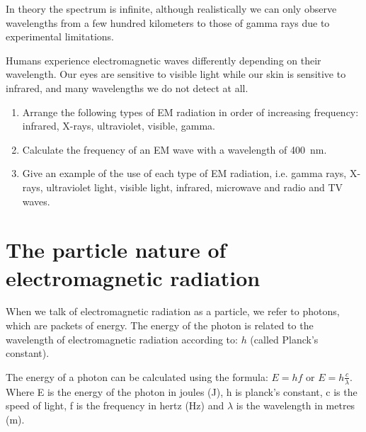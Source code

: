 In theory the spectrum is infinite, although realistically we can only observe wavelengths from a few hundred kilometers to those of gamma rays due to experimental limitations. 

Humans experience electromagnetic waves differently depending on their wavelength. Our eyes are sensitive to visible light while our skin is sensitive to infrared, and many wavelengths we do not detect at all.

{
\begin{enumerate}
\item Arrange the following types of EM radiation in order of increasing frequency: infrared, X-rays, ultraviolet, visible, gamma. 
\item Calculate the frequency of an EM wave with a wavelength of 400~nm.
\item Give an example of the use of each type of EM radiation, i.e. gamma rays, X-rays, ultraviolet light, visible light, infrared, microwave and radio and TV waves.
\end{enumerate}
}

\section{The particle nature of electromagnetic radiation}

When we talk of electromagnetic radiation as a particle, we refer to photons, which are packets of energy. The energy of the photon is related to the wavelength of electromagnetic radiation according to:
$h$ (called Planck's constant).







The energy of a photon can be calculated using the formula: $E=hf$ or $E=h \frac{c}{\lambda}$.
Where E is the energy of the photon in joules (J), h is planck's constant, c is the speed of light, f is the frequency in hertz (Hz) and $\lambda$ is the wavelength in metres (m).

